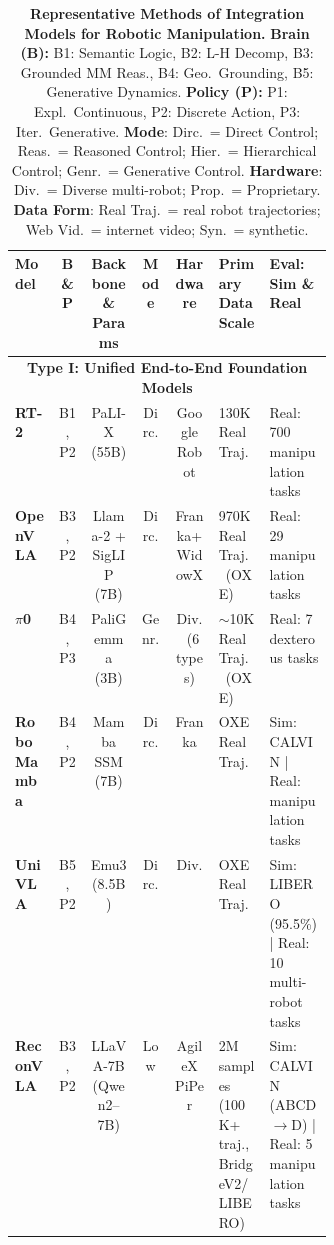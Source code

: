 \documentclass[acmsmall,screen,review]{acmart}
\begin{document}
\begin{table}[t!]
\centering
\caption{\textbf{Representative Methods of Integration Models for Robotic Manipulation.}
\textbf{Brain (B):} B1: Semantic Logic, B2: L-H Decomp, B3: Grounded MM Reas., B4: Geo.\ Grounding, B5: Generative Dynamics.
\textbf{Policy (P):} P1: Expl.\ Continuous, P2: Discrete Action, P3: Iter.\ Generative.
\textbf{Mode}: Dirc.\ = Direct Control; Reas.\ = Reasoned Control; Hier.\ = Hierarchical Control; Genr.\ = Generative Control.
\textbf{Hardware}: Div.\ = Diverse multi-robot; Prop.\ = Proprietary.
\textbf{Data Form}: Real Traj.\ = real robot trajectories; Web Vid.\ = internet video; Syn.\ = synthetic.}\label{tab:integration_methods}
\renewcommand{\arraystretch}{1.2}
\setlength{\tabcolsep}{3pt}
\scriptsize

\begin{tabular}{
  l
  c
  c
  c
  c
  p{0.168\linewidth}
  p{0.205\linewidth}
}
\toprule
\textbf{Model} &
\textbf{B \& P} &
\textbf{Backbone \& Params} &
\textbf{Mode} &
\textbf{Hardware} &
\textbf{Primary Data Scale} &
\textbf{Eval: Sim \& Real} \\
\midrule

\multicolumn{7}{c}{\textbf{Type I\@: Unified End-to-End Foundation Models}} \\
\midrule

\textbf{RT-2}~\cite{brohan2023rt2} & B1, P2 & PaLI-X (55B) & Dirc. & Google Robot & 130K Real Traj. & Real: 700 manipulation tasks \\

\textbf{OpenVLA}~\cite{kim2024openvla} & B3, P2 & Llama-2 + SigLIP (7B) & Dirc. & Franka+WidowX & 970K Real Traj.\ (OXE) & Real: 29 manipulation tasks \\

\textbf{$\pi$0}~\cite{black2024pi0} & B4, P3 & PaliGemma (3B) & Genr. & Div.\ (6 types) & $\sim$10K Real Traj.\ (OXE) & Real: 7 dexterous tasks \\

\textbf{RoboMamba}~\cite{liu2024robomamba} & B4, P2 & Mamba SSM (7B) & Dirc. & Franka & OXE Real Traj. & Sim: CALVIN | Real: manipulation tasks \\

\textbf{UniVLA}~\cite{bu2025univla} & B5, P2 & Emu3 (8.5B) & Dirc. & Div. & OXE Real Traj. & Sim: LIBERO (95.5\%) | Real: 10 multi-robot tasks \\

\textbf{ReconVLA}~\cite{song2025reconvla} & B3, P2 & LLaVA-7B (Qwen2--7B) & Low & AgileX PiPer & 2M samples (100K+ traj., BridgeV2/LIBERO) & Sim: CALVIN (ABCD$\rightarrow$D) | Real: 5 manipulation tasks \\


\end{tabular}
\end{table}
\end{document}
